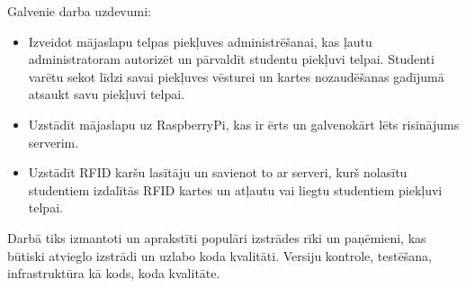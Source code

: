 Galvenie darba uzdevumi:
\begin{itemize}
  \item Izveidot mājaslapu telpas piekļuves administrēšanai, kas ļautu administratoram autorizēt un pārvaldīt studentu piekļuvi telpai. Studenti varētu sekot līdzi savai piekļuves vēsturei un kartes nozaudēšanas gadījumā atsaukt savu piekļuvi telpai.
  \item Uzstādīt mājaslapu uz RaspberryPi, kas ir ērts un galvenokārt lēts risinājums serverim.
  \item Uzstādīt RFID karšu lasītāju un savienot to ar serveri, kurš nolasītu studentiem izdalītās RFID kartes un atļautu vai liegtu studentiem piekļuvi telpai.
\end{itemize}

Darbā tiks izmantoti un aprakstīti populāri izstrādes rīki un paņēmieni, kas būtiski atvieglo izstrādi un uzlabo koda kvalitāti.
Versiju kontrole, testēšana, infrastruktūra kā kods, koda kvalitāte.



